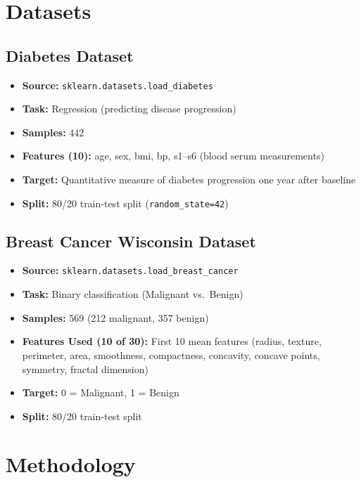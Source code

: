 \documentclass[12pt,a4paper]{article}
\begin{document}
\section{Datasets}

\subsection{Diabetes Dataset}
\begin{itemize}
    \item \textbf{Source:} \texttt{sklearn.datasets.load\_diabetes}
    \item \textbf{Task:} Regression (predicting disease progression)
    \item \textbf{Samples:} 442
    \item \textbf{Features (10):} age, sex, bmi, bp, s1--s6 (blood serum measurements)
    \item \textbf{Target:} Quantitative measure of diabetes progression one year after baseline
    \item \textbf{Split:} 80/20 train-test split (\texttt{random\_state=42})
\end{itemize}

\subsection{Breast Cancer Wisconsin Dataset}
\begin{itemize}
    \item \textbf{Source:} \texttt{sklearn.datasets.load\_breast\_cancer}
    \item \textbf{Task:} Binary classification (Malignant vs.\ Benign)
    \item \textbf{Samples:} 569 (212 malignant, 357 benign)
    \item \textbf{Features Used (10 of 30):} First 10 mean features (radius, texture, perimeter, area, smoothness, compactness, concavity, concave points, symmetry, fractal dimension)
    \item \textbf{Target:} 0 = Malignant, 1 = Benign
    \item \textbf{Split:} 80/20 train-test split
\end{itemize}

\section{Methodology}
\end{document}
